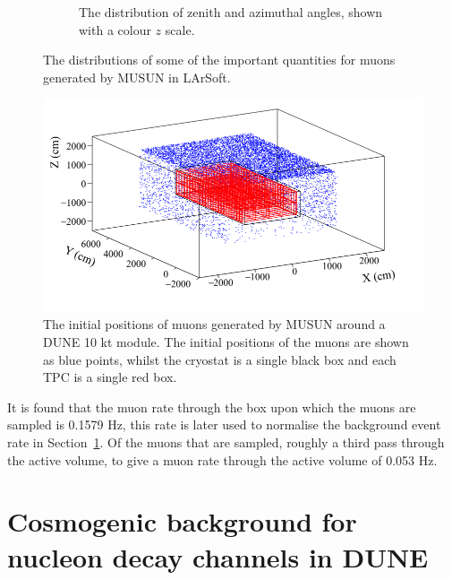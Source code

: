 \begin{figure}[h!]
\begin{subfigure}{0.45\textwidth}
    \caption{The distribution of zenith and azimuthal angles, shown with a colour $z$ scale.}
  \end{subfigure}
  \caption[The distributions of some of the important quantities for muons generated by MUSUN in LArSoft]
          {The distributions of some of the important quantities for muons generated by MUSUN in LArSoft.}
  \label{fig:MUSUNIncorp}
\end{figure}

\begin{figure}[h!]
  \centering
  \includegraphics[width=\textwidth]{MuonPosCan}
  \caption[The initial positions of muons generated by MUSUN around a DUNE 10 kt module]
          {The initial positions of muons generated by MUSUN around a DUNE 10 kt module. The initial positions of the muons are shown as blue points, whilst the cryostat is a single black box and each TPC is a single red box.}
  \label{fig:10ktPos}
\end{figure}

It is found that the muon rate through the box upon which the muons are sampled is 0.1579 Hz, this rate is later used to normalise the background event rate in Section~\ref{sec:DUNENDK}. Of the muons that are sampled, roughly a third pass through the active volume, to give a muon rate through the active volume of 0.053 Hz. \\ 

\section{Cosmogenic background for nucleon decay channels in DUNE} \label{sec:DUNENDK} %
